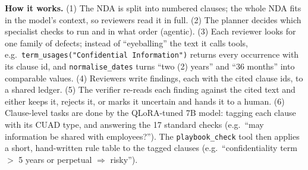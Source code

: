 \documentclass[11pt,a4paper]{article}
\begin{document}
\textbf{How it works.} (1) The NDA is split into numbered clauses; the whole NDA fits in the model's context, so reviewers read it in full. (2) The planner decides which
specialist checks to run and in what order (agentic). (3) Each reviewer looks for one family of defects; instead of
``eyeballing'' the text it calls tools, e.g.\ \texttt{term\_usages("Confidential Information")} returns every occurrence
with its clause id, and \texttt{normalise\_dates} turns ``two (2) years'' and ``36 months'' into comparable values.
(4) Reviewers write findings, each with the cited clause ids, to a shared ledger. (5) The verifier re-reads each finding
against the cited text and either keeps it, rejects it, or marks it uncertain and hands it to a human. (6) Clause-level
tasks are done by the QLoRA-tuned 7B model: tagging each clause with its CUAD type, and answering the 17 standard
checks (e.g.\ ``may information be shared with employees?''). The \texttt{playbook\_check} tool then applies a short,
hand-written rule table to the tagged clauses (e.g.\ ``confidentiality term $>$ 5 years or perpetual $\Rightarrow$ risky'').

\end{document}
